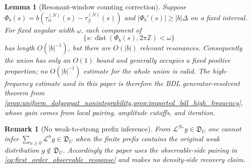 \documentclass[11pt]{amsart}
\theoremstyle{compactplain}
\newtheorem*{lemma*}{Lemma}
\theoremstyle{compactdefinition}
\theoremstyle{compactremark}
\newtheorem*{remark*}{Remark}
\newcommand{\Ltransfer}{\mathscr L}
\begin{document}
\begin{lemma*}[Resonant-window counting correction]
Suppose
\(\Phi_b(s)=b(\tau_\alpha^{(N)}(s)-\tau_\beta^{(N)}(s))\) and
\(|\Phi_b'(s)|\ge |b|\Delta\) on a fixed interval.  For fixed angular width
\(\omega\), each component of
\[
  \{s:\operatorname{dist}(\Phi_b(s),2\pi\mathbb Z)<\omega\}
\]
has length \(O(|b|^{-1})\), but there are \(O(|b|)\) relevant resonances.
Consequently the union has only an \(O(1)\) bound and generally occupies a
fixed positive proportion; no \(O(|b|^{-1})\) estimate for the whole union is
valid.  The high-frequency estimate used in this paper is therefore the BDL
generator-resolvent theorem from
\cref{prop:uniform_dolgopyat_nonintegrability,prop:imported_bdl_high_frequency},
whose gain comes from local pairing, amplitude cutoffs, and iteration.
\end{lemma*}

\begin{remark*}[No weak-to-strong prefix inference]
From \(\Ltransfer^{N_*}g\in\mathfrak D_U\) one cannot infer
\(\sum_{n\ge0}\Ltransfer^ng\in\mathfrak D_U\) when the finite prefix contains
the original weak distribution \(g\notin\mathfrak D_U\).  Accordingly the
paper uses the observable-side pairing in
\cref{eq:first_order_observable_response} and makes no density-side recovery
claim.
\end{remark*}



{\scriptsize


}
\end{document}
